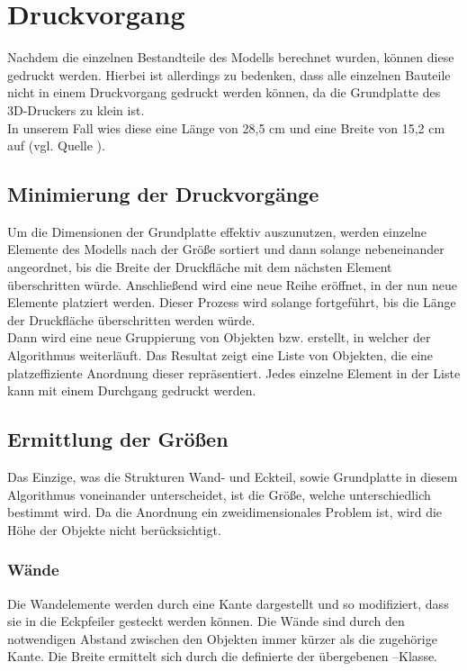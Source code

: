 \section{Druckvorgang}
Nachdem die einzelnen Bestandteile des Modells berechnet wurden, können diese gedruckt werden.
Hierbei ist allerdings zu bedenken, dass alle einzelnen Bauteile nicht in einem Druckvorgang gedruckt werden können, da die Grundplatte des 3D-Druckers zu klein ist. \\
In unserem Fall wies diese eine Länge von 28,5 cm und eine Breite von 15,2 cm auf (vgl. Quelle \cite{makerbotspecs}).

\subsection{Minimierung der Druckvorgänge}
Um die Dimensionen der Grundplatte effektiv auszunutzen, werden einzelne Elemente des Modells nach der Größe sortiert und dann solange nebeneinander angeordnet, bis die Breite der Druckfläche mit dem nächsten Element überschritten würde.
Anschließend wird eine neue Reihe eröffnet, in der nun neue Elemente platziert werden. 
Dieser Prozess wird solange fortgeführt, bis die Länge der Druckfläche überschritten werden würde. \\
Dann wird eine neue Gruppierung von Objekten bzw.  erstellt, in welcher der Algorithmus weiterläuft.
Das Resultat zeigt eine Liste von Objekten, die eine platzeffiziente Anordnung dieser repräsentiert.
Jedes einzelne Element in der Liste kann mit einem Durchgang gedruckt werden.

\subsection{Ermittlung der Größen}
Das Einzige, was die Strukturen Wand- und Eckteil, sowie Grundplatte in diesem Algorithmus voneinander unterscheidet, ist die Größe, welche unterschiedlich bestimmt wird.
Da die Anordnung ein zweidimensionales Problem ist, wird die Höhe der Objekte nicht berücksichtigt.

\subsubsection{Wände}
Die Wandelemente werden durch eine Kante dargestellt und so modifiziert, dass sie in die Eckpfeiler gesteckt werden können.
Die Wände sind durch den notwendigen Abstand zwischen den Objekten immer kürzer als die zugehörige Kante. 
Die Breite ermittelt sich durch die definierte  der übergebenen --Klasse.

